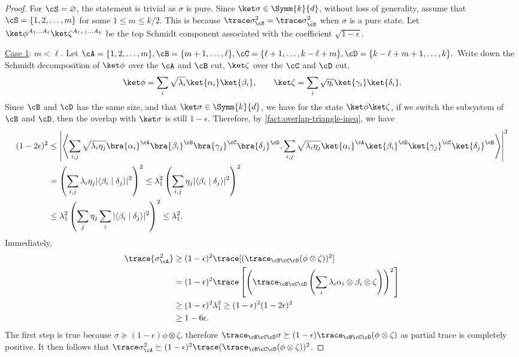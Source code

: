 \begin{proof}
For $\cS =\varnothing$, the statement is trivial as $\sigma$ is pure. Since $\ket\sigma\in\Symm{k}{d}$, without loss of generality, assume that 
$\cS=\{1, 2, \ldots, m\}$ for some $1 \le m \le k/2$. This is because 
$\trace \sigma_\cS^2 = \trace \sigma^2_{\bar\cS}$ when $\sigma$ is a pure state. Let $\ket\phi ^{A_1\ldots A_\ell} \ket\zeta ^{A_{\ell+1}\ldots A_k}$ be the 
top Schmidt component associated with the coefficient $\sqrt{1-\epsilon}$. 


\uline{Case 1}: $m < \ell$. Let $\cA = \{1, 2, \ldots, m\}, \cB = \{m+1, \ldots, \ell\}, \cC = \{\ell+1, \ldots, k-\ell+m \}, \cD = \{k-\ell+m+1, \ldots, k\}.$ Write down the Schmidt decomposition of $\ket\phi$ over the $\cA$ and $\cB$ cut, $\ket\zeta$ over the $\cC$ and $\cD$ cut,
\begin{equation}
    \ket\phi = \sum_i \sqrt{\lambda_i} \ket{\alpha_i}\ket{\beta_i}, 
    \qquad
    \ket\zeta = \sum_i \sqrt{\eta_i} \ket{\gamma_i} \ket{\delta_i}.
    \nonumber
\end{equation}
Since $\cB$ and $\cD$ has the same size, and that $\ket\sigma\in\Symm{k}{d}$, we have for the state $\ket\phi\ket\zeta$, if we switch the subsystem of $\cB$ and $\cD$, then the overlap with $\ket\sigma$ is still $1-\epsilon$. Therefore, by \cref{fact:overlap-triangle-ineq}, we have
\begin{align}
    (1-2\epsilon)^2 
    &\le \left|\left\langle
        \sum_{i,j} \sqrt{\lambda_i\eta_j}\bra{\alpha_i}^\cA\bra{\beta_i}^\cB
         \bra{\gamma_j}^\cC\bra{\delta_j}^\cD,
        \sum_{i,j} \sqrt{\lambda_i\eta_j}\ket{\alpha_i}^\cA\ket{\beta_i}^\cD
        \ket{\gamma_j}^\cC\ket{\delta_j}^\cB
    \right\rangle\right|^2
    \nonumber \\
    & = \left(\sum_{i,j} \lambda_i\eta_j |\langle \beta_i \mid \delta_j \rangle|^2\right)^2
    \le  \lambda_1^2 \left(  \sum_{i,j}\eta_j |\langle \beta_i \mid \delta_j \rangle|^2 \right) ^2
    \nonumber\\
    &\le \lambda_1^2 \left(  \sum_{j}\eta_j \sum_i|\langle \beta_i \mid \delta_j \rangle|^2 \right)^2
    \le \lambda_1 ^2.
    \nonumber
\end{align}
Immediately,
\begin{align}
    \trace{\sigma_\cA ^2 } 
    &\ge (1-\epsilon)^2\trace [(\trace_{\cB\cC\cD}  (\phi\otimes\zeta) )^2]
    \nonumber \\
    &= (1-\epsilon)^2\trace \left[\left(\trace_{\cB\cC\cD} \left(
    \sum_i \lambda_i \alpha_i \otimes \beta_i\otimes\zeta
    \right) \right) ^2\right]
    \nonumber \\
    &\ge (1-\epsilon)^2 \lambda_1 ^2 \ge (1-\epsilon)^2 (1-2\epsilon)^2
    \nonumber\\
    &\ge 1-6\epsilon.\label{eq:many-many-case1-corr}
\end{align} 
The first step is true because $\sigma \succeq (1-\epsilon)\phi\otimes \zeta$, therefore  $\trace_{\cB\cC\cD}\sigma \succeq (1-\epsilon)\trace_{\cB\cC\cD}(\phi\otimes \zeta)$ as partial trace is completely positive. It then follows that $\trace\sigma_\cA ^2 \succeq (1-\epsilon)^2\trace(\trace_{\cB\cC\cD}(\phi\otimes\zeta)) ^2$.

\end{proof}
